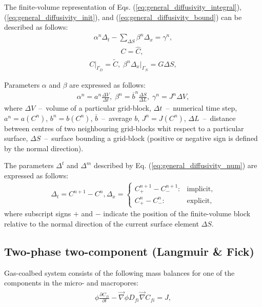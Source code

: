 \documentclass[a4paper,14pt,english]{extreport}
\begin{document}
The finite-volume representation of Eqs. (\ref{eq:general_diffusivity_integral}), (\ref{eq:general_diffusivity_init}), and (\ref{eq:general_diffusivity_bound}) can be described as follows:
    \begin{eqnarray}
        \label{eq:general_diffusivity_num}
        \alpha^n \Delta_{t} - \sum_{\Delta S} \beta^n\Delta_{x} = \gamma^n,
    \end{eqnarray}
    \begin{eqnarray}
         \label{eq:general_diffusivity_num_init}
        C = \hat{C}, \; 
    \end{eqnarray}
    \begin{eqnarray}
    \label{eq:general_diffusivity_num_bound}
    C \Big|_{\mathit{\Gamma}_D}= \tilde{C}, \; \beta^n\Delta_x \Big|_{\mathit{\Gamma}_N} = G\Delta S,
    \end{eqnarray}

Parameters $\alpha$ and $\beta$ are expressed as follows:
    \begin{eqnarray}
        \label{eq:general_alpha_beta_gamma}
        \alpha^n = a^n\frac{\Delta V}{\Delta t}, \;
        \beta^n = \overline{b}^n\frac{\Delta S}{\Delta L}, \; \gamma^n = J^n \Delta V,
    \end{eqnarray}
where $\Delta V$~--~volume of a particular grid-block, $\Delta t$~--~numerical time step, $a^n = a\left(C^n\right)$, $b^n = b\left(C^n\right)$, $\overline{b}$~--~average $b$, $J^n=J\left(C^n\right)$, $\Delta L$~--~distance between centres of two neighbouring grid-blocks whit respect to a particular surface, $\Delta S$~--~surface bounding a grid-block (positive or negative sign is defined by the normal direction).

The parameters $\Delta^{t}$ and $\Delta^{m}$ described by Eq. (\ref{eq:general_diffusivity_num}) are expressed as follows:
    \begin{eqnarray}
    \label{eq:general_delta_num}
    \Delta_t = C^{n+1} - C^{n}, \Delta_x = \begin{cases}
    C_{+}^{n+\mathit1} - C_{-}^{n+\mathit1} : &\text{implicit},\\
        C_{+}^{n} - C_{-}^{n} : &\text{explicit},
    \end{cases}
    \end{eqnarray}
where subscript signs $+$ and $-$ indicate the position of the finite-volume block relative to the normal direction of the current surface element $\Delta S$.

\subsection*{Two-phase two-component (Langmuir \& Fick)}
Gas-coalbed system consists of the following mass balances for one of the components in the micro- and macropores:
\begin{eqnarray}
\begin{gathered}
\label{eq:multiphase_free_diffusivity_differential}
\phi \frac{\partial C_{fi}}{\partial t}  - \vec{\nabla} \phi D_{fi} \vec{\nabla}C_{fi} = J,
\end{gathered}
\end{eqnarray}
\end{document}
